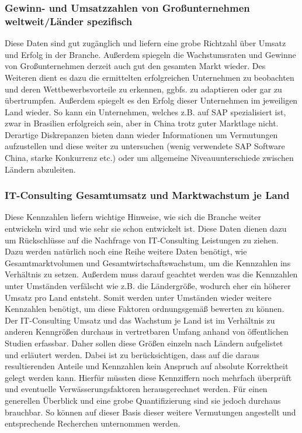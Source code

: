 \subsubsection{Gewinn- und Umsatzzahlen von Großunternehmen weltweit/Länder spezifisch}
Diese Daten sind gut zugänglich und liefern eine grobe Richtzahl über Umsatz und Erfolg in der Branche. 
Außerdem spiegeln die Wachstumsraten und Gewinne von Großunternehmen derzeit auch gut den gesamten Markt wieder. 
Des Weiteren dient es dazu die ermittelten erfolgreichen Unternehmen zu beobachten und deren  Wettbewerbsvorteile zu erkennen, ggbfs. zu adaptieren oder gar zu übertrumpfen.
Außerdem spiegelt es den Erfolg dieser Unternehmen im jeweiligen Land wieder. So kann ein Unternehmen, welches z.B. auf SAP spezialisiert ist, zwar in Brasilien erfolgreich sein, aber in China trotz guter Marktlage nicht. 
 Derartige Diskrepanzen bieten dann wieder Informationen um Vermutungen aufzustellen und diese weiter zu untersuchen (wenig verwendete SAP Software China, starke Konkurrenz etc.) oder um allgemeine Niveauunterschiede zwischen Ländern abzuleiten.

\subsubsection{IT-Consulting Gesamtumsatz und Marktwachstum je Land}
Diese Kennzahlen liefern wichtige Hinweise, wie sich die Branche weiter entwickeln wird und wie sehr sie schon entwickelt ist. 
Diese Daten dienen dazu um Rückschlüsse auf die Nachfrage von IT-Consulting Leistungen zu ziehen. 
Dazu werden natürlich noch eine Reihe weitere Daten benötigt, wie Gesamtmarktvolumen und Gesamtwirtschaftswachstum, um die Kennzahlen ins Verhältnis zu setzen.
 Außerdem muss darauf geachtet werden was die Kennzahlen unter Umständen verfälscht wie z.B. die Ländergröße, wodurch eher ein höherer Umsatz pro Land entsteht. 
 Somit werden unter Umständen wieder weitere Kennzahlen benötigt, um diese Faktoren ordnungsgemäß bewerten zu können.
Der IT-Consulting Umsatz und das Wachstum je Land ist im Verhältnis zu anderen Kenngrößen durchaus in vertretbaren Umfang anhand von öffentlichen Studien erfassbar. 
Daher sollen diese Größen einzeln nach Ländern aufgelistet und erläutert werden.
 Dabei ist zu berücksichtigen, dass auf die daraus resultierenden Anteile und Kennzahlen kein Anspruch auf absolute Korrektheit gelegt werden kann. 
 Hierfür müssten diese Kennziffern noch mehrfach überprüft und eventuelle Verwässerungsfaktoren herausgerechnet werden. 
 Für einen generellen Überblick und eine grobe Quantifizierung sind sie jedoch durchaus brauchbar. So können auf dieser Basis dieser weitere Vermutungen angestellt und entsprechende Recherchen unternommen werden.


